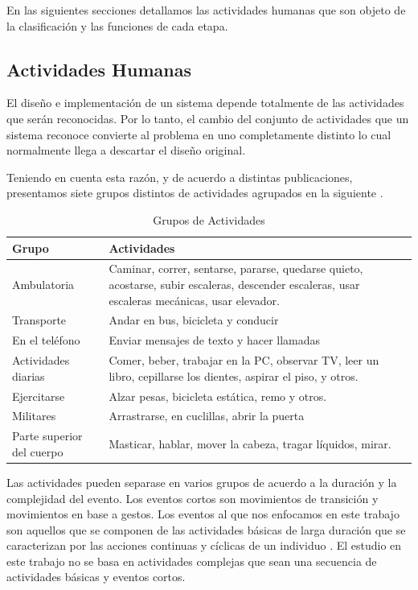 En las siguientes secciones detallamos las actividades humanas que
son objeto de la clasificación y las funciones de cada etapa.

\subsection{Actividades Humanas}

\label{sec263:actividades-humanas} El diseño e implementación de
un sistema  depende totalmente de las actividades que serán
reconocidas. Por lo tanto, el cambio del conjunto de actividades que
un sistema reconoce convierte al problema en uno completamente distinto
lo cual normalmente llega a descartar el diseño original.

Teniendo en cuenta esta razón, y de acuerdo a distintas publicaciones,
presentamos siete grupos distintos de actividades agrupados en la
siguiente  \cite{LaraLabrador2013}.

\begin{table}[htbp]
\centering{}%
\begin{tabular}{|l|p{9cm}|}
\hline 
\textbf{Grupo}  & \textbf{Actividades} \tabularnewline
\hline 
\hline 
Ambulatoria  & Caminar, correr, sentarse, pararse, quedarse quieto, acostarse, subir
escaleras, descender escaleras, usar escaleras mecánicas, usar elevador.\tabularnewline
\hline 
Transporte  & Andar en bus, bicicleta y conducir \tabularnewline
\hline 
En el teléfono  & Enviar mensajes de texto y hacer llamadas \tabularnewline
\hline 
Actividades diarias  & Comer, beber, trabajar en la PC, observar TV, leer un libro, cepillarse
los dientes, aspirar el piso, y otros. \tabularnewline
\hline 
Ejercitarse  & Alzar pesas, bicicleta estática, remo y otros. \tabularnewline
\hline 
Militares  & Arrastrarse, en cuclillas, abrir la puerta \tabularnewline
\hline 
Parte superior del cuerpo  & Masticar, hablar, mover la cabeza, tragar líquidos, mirar. \tabularnewline
\hline 
\end{tabular}\caption[Grupos de Actividades]{\label{tab2:grupo-actividades}Grupos de Actividades}
\end{table}

Las actividades pueden separase en varios grupos de acuerdo a la duración
y la complejidad del evento. Los eventos cortos son movimientos de
transición y movimientos en base a gestos. Los eventos al que nos
enfocamos en este trabajo son aquellos que se componen de las actividades
básicas de larga duración que se caracterizan por las acciones continuas
y cíclicas de un individuo \cite{ReyesOrtiz2015}. El estudio en este
trabajo no se basa en actividades complejas que sean una secuencia
de actividades básicas y eventos cortos.

